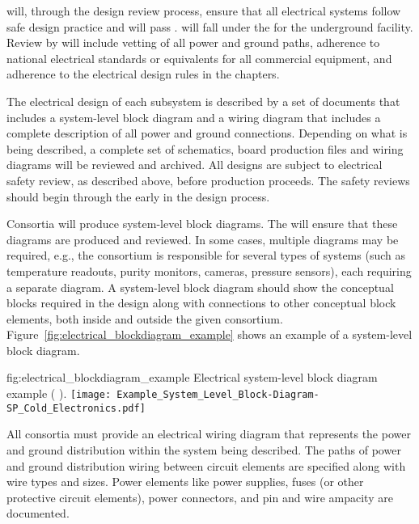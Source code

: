  will, through the design review process, ensure
that all electrical systems  follow safe design practice and
will pass .   will fall under the  for the
underground facility.  Review by  will include
vetting of all power and ground paths, adherence to national
electrical standards or equivalents for all commercial equipment, and
adherence to the electrical design rules in the   %
chapters.

The electrical design of each subsystem is described by a set of
documents that includes a system-level block diagram and a wiring
diagram that includes a complete description of all power and ground
connections.  Depending on what is being described, a complete set of
schematics, board production files and wiring diagrams will be
reviewed and archived.  All designs are subject to electrical safety
review, as described above, before production proceeds. The safety
reviews should begin through the  early in the design
process.



Consortia will produce system-level block diagrams. The 
will ensure that these diagrams are produced and reviewed.  In
some cases, multiple %
diagrams may be required, e.g., the %
 consortium %
is responsible for several types of
systems (such as temperature readouts, purity monitors, cameras,
pressure sensors), each requiring a separate %
diagram. A system-level block diagram should show the conceptual
blocks required in the design along with connections to other
conceptual block elements, both inside and outside the given consortium.
Figure~\ref{fig:electrical_blockdiagram_example} shows an example of a
system-level block diagram.
\begin{dunefigure}{fig:electrical_blockdiagram_example}
  {Electrical system-level block diagram example ( ).}
 \texttt{[image: Example\_System\_Level\_Block-Diagram-SP\_Cold\_Electronics.pdf]}
\end{dunefigure}


All consortia must provide an electrical wiring diagram that 
represents the power and ground distribution within the system being
described.  The paths of power and ground distribution wiring between
circuit elements are specified along with wire types and sizes.  Power
elements like power supplies, fuses (or other protective circuit
elements), power connectors, and pin and wire ampacity are documented.


